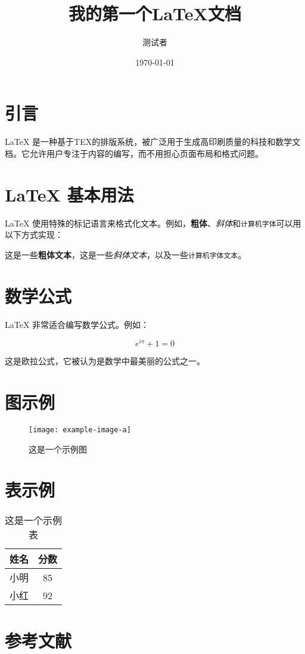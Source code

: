 \documentclass{article} %
\title{我的第一个LaTeX文档} %
\author{测试者} %
\date{\today} %
\begin{document}
\maketitle %

\tableofcontents %
\listoffigures %
\listoftables %

\section{引言}
LaTeX 是一种基于ΤΕΧ的排版系统，被广泛用于生成高印刷质量的科技和数学文档。它允许用户专注于内容的编写，而不用担心页面布局和格式问题。

\section{LaTeX 基本用法}
LaTeX 使用特殊的标记语言来格式化文本。例如，\textbf{粗体}、\textit{斜体}和\texttt{计算机字体}可以用以下方式实现：

这是一些\textbf{粗体文本}，这是一些\textit{斜体文本}，以及一些\texttt{计算机字体文本}。

\section{数学公式}
LaTeX 非常适合编写数学公式。例如：

\[ e^{i\pi} + 1 = 0 \]

这是欧拉公式，它被认为是数学中最美丽的公式之一。

\section{图示例}
\begin{figure}[htbp]
    \centering
    \texttt{[image: example-image-a]}
    \caption{这是一个示例图}
    \label{fig:example}
\end{figure}

\section{表示例}
\begin{table}[htbp]
    \centering
    \begin{tabular}{|c|c|}
        \hline
        姓名 & 分数 \\
        \hline
        小明 & 85 \\
        小红 & 92 \\
        \hline
    \end{tabular}
    \caption{这是一个示例表}
    \label{tab:example}
\end{table}

\section{参考文献}
\nocite{*}



\printnomenclature
\end{document}

